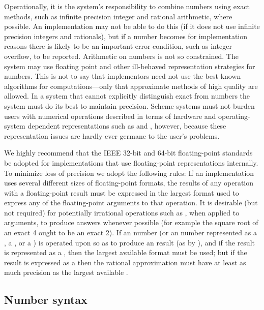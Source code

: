 \vest Operationally, it is the system's responsibility to combine 
numbers using exact methods, such as infinite precision integer and
rational arithmetic, where possible.  An implementation may not be able to
do this (if it does not use infinite precision integers and rationals), but
if a number becomes  for implementation reasons there is
likely to be an important error condition, such as integer overflow, to be
reported.  Arithmetic on  numbers is not so constrained.  The
system may use floating point and other ill-behaved representation
strategies for  numbers.  This is not to say that
implementors need not use the best known algorithms for 
computations---only that approximate methods of high quality are allowed.
In a system that cannot explicitly distinguish exact from 
numbers the system must do its best to maintain precision.  Scheme systems
must not burden users with numerical operations described in terms of
hardware and operating-system dependent representations such as
 and , however, because these representation
issues are hardly ever germane to the user's problems.

\vest We highly recommend that the IEEE 32-bit and 64-bit floating-point
standards be adopted for implementations that use floating-point
representations internally.  To minimize loss of precision we adopt the
following rules: If an implementation uses several different sizes of
floating-point formats, the results of any operation with a floating-point
result must be expressed in the largest format used to express any of the
floating-point arguments to that operation.  It is desirable (but not
required) for potentially irrational operations such as , when
applied to  arguments, to produce  answers whenever
possible (for example the square root of an exact 4 ought to be an exact
2).  If an  number (or an  number represented as
a , a , or a ) is operated upon so
as to produce an  result (as by ), and if the
result is represented as a , then the largest available
 format must be used; but if the result is expressed as a
 then the rational approximation must have at least as much
precision as the largest available .


\subsection{Number syntax}
\label{numbernotations}

